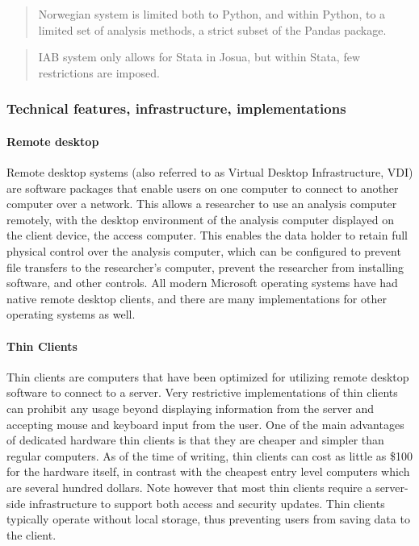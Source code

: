 \begin{quote}
Norwegian system is limited both to Python, and within Python, to a
limited set of analysis methods, a strict subset of the Pandas package.
\end{quote}

\begin{quote}
IAB system only allows for Stata in Josua, but within Stata, few
restrictions are imposed.
\end{quote}

\hypertarget{technical-features-infrastructure-implementations}{%
\subsubsection{Technical features, infrastructure,
implementations}\label{technical-features-infrastructure-implementations}}

\hypertarget{remote-desktop}{%
\paragraph{Remote desktop}\label{remote-desktop}}

Remote desktop systems (also referred to as Virtual Desktop
Infrastructure, VDI) are software packages that enable users on one
computer to connect to another computer over a network. This allows a
researcher to use an analysis computer remotely, with the desktop
environment of the analysis computer displayed on the client device, the
access computer. This enables the data holder to retain full physical
control over the analysis computer, which can be configured to prevent
file transfers to the researcher's computer, prevent the researcher from
installing software, and other controls. All modern Microsoft operating
systems have had native remote desktop clients, and there are many
implementations for other operating systems as well.

\hypertarget{thin-clients}{%
\paragraph{Thin Clients}\label{thin-clients}}

Thin clients are computers that have been optimized for utilizing remote
desktop software to connect to a server. Very restrictive
implementations of thin clients can prohibit any usage beyond displaying
information from the server and accepting mouse and keyboard input from
the user. One of the main advantages of dedicated hardware thin clients
is that they are cheaper and simpler than regular computers. As of the
time of writing, thin clients can cost as little as \$100 for the
hardware itself, in contrast with the cheapest entry level computers
which are several hundred dollars. Note however that most thin clients
require a server-side infrastructure to support both access and security
updates. Thin clients typically operate without local storage, thus
preventing users from saving data to the client.

